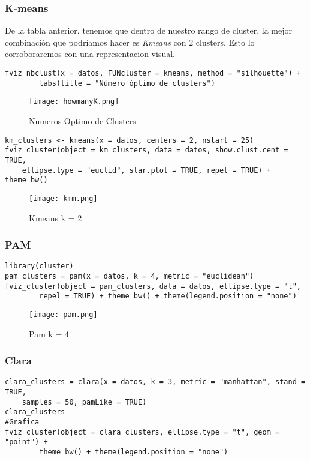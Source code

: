 \documentclass[b4paper]{article}
\begin{document}
    \subsubsection{K-means}
    De la tabla anterior, tenemos que dentro de nuestro rango de cluster, la mejor combinaci\'on que podr\'iamos hacer es \textit{Kmeans} con 2 clusters. Esto lo corroboraremos con una representacion visual.
    \begin{tcolorbox}
        \begin{verbatim}
fviz_nbclust(x = datos, FUNcluster = kmeans, method = "silhouette") +
        labs(title = "Número óptimo de clusters")\end{verbatim}
    \end{tcolorbox}
    \begin{figure}[h]
        \centering
        \texttt{[image: howmanyK.png]}
        \caption{Numeros Optimo de Clusters}
    \end{figure}
    \begin{tcolorbox}
        \begin{verbatim}
km_clusters <- kmeans(x = datos, centers = 2, nstart = 25)
fviz_cluster(object = km_clusters, data = datos, show.clust.cent = TRUE,
    ellipse.type = "euclid", star.plot = TRUE, repel = TRUE) + theme_bw()\end{verbatim}
    \end{tcolorbox}
    \newpage
    \begin{figure}[h]
        \centering
        \texttt{[image: kmm.png]}
        \caption{Kmeans k = 2}
    \end{figure}
    \subsubsection{PAM}
    \begin{tcolorbox}
        \begin{verbatim}
library(cluster)
pam_clusters = pam(x = datos, k = 4, metric = "euclidean")
fviz_cluster(object = pam_clusters, data = datos, ellipse.type = "t",
        repel = TRUE) + theme_bw() + theme(legend.position = "none")\end{verbatim}
    \end{tcolorbox}

    \begin{figure}[h]
        \centering
        \texttt{[image: pam.png]}
        \caption{Pam k = 4}
    \end{figure}
    \subsubsection{Clara}
    \begin{tcolorbox}
        \begin{verbatim}
clara_clusters = clara(x = datos, k = 3, metric = "manhattan", stand = TRUE,
    samples = 50, pamLike = TRUE)
clara_clusters
#Grafica
fviz_cluster(object = clara_clusters, ellipse.type = "t", geom = "point") +
        theme_bw() + theme(legend.position = "none")\end{verbatim}
    \end{tcolorbox}
\end{document}
